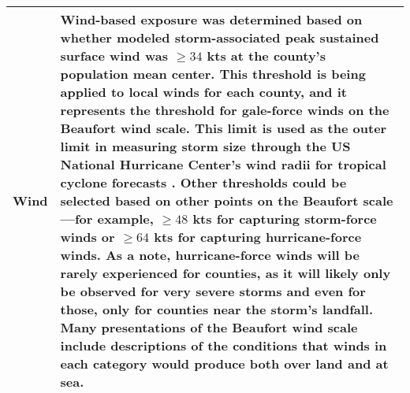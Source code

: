 \begin{longtable}{lp{35em}}
\textbf{Wind} & Wind-based exposure was determined based on whether modeled storm-associated peak sustained surface wind was $\ge34$ kts at the county’s population mean center. This threshold is being applied to local winds for each county, and it represents the threshold for gale-force winds on the Beaufort wind scale. This limit is used as the outer limit in measuring storm size through the US National Hurricane Center's wind radii for tropical cyclone forecasts \parencite{cangialosi2016examination}. Other thresholds could be selected based on other points on the Beaufort scale---for example, $\ge48$ kts for capturing storm-force winds or $\ge64$ kts for capturing hurricane-force winds. As a note, hurricane-force winds will be rarely experienced for counties, as it will likely only be observed for very severe storms and even for those, only for counties near the storm's landfall. Many presentations of the Beaufort wind scale include descriptions of the conditions that winds in each category would produce both over land and at sea.\\
\hline
\end{longtable}